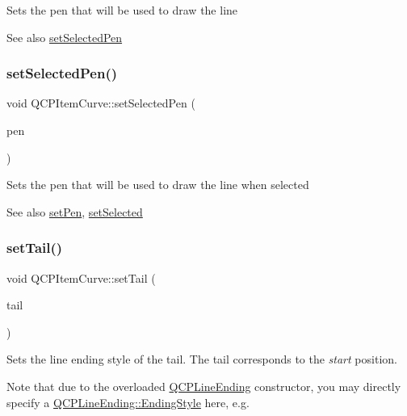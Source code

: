 Sets the pen that will be used to draw the line

\begin{DoxySeeAlso}{See also}
\mbox{\hyperlink{class_q_c_p_item_curve_a375b917669f868c5a106bf2f1ab7c26d}{set\+Selected\+Pen}} 
\end{DoxySeeAlso}
\mbox{\label{class_q_c_p_item_curve_a375b917669f868c5a106bf2f1ab7c26d}} 
\subsubsection{\texorpdfstring{setSelectedPen()}{setSelectedPen()}}
{\footnotesize\ttfamily void Q\+C\+P\+Item\+Curve\+::set\+Selected\+Pen (\begin{DoxyParamCaption}\item[{const Q\+Pen \&}]{pen }\end{DoxyParamCaption})}

Sets the pen that will be used to draw the line when selected

\begin{DoxySeeAlso}{See also}
\mbox{\hyperlink{class_q_c_p_item_curve_a034be908440aec785c34b92843461221}{set\+Pen}}, \mbox{\hyperlink{class_q_c_p_abstract_item_a203de94ad586cc44d16c9565f49d3378}{set\+Selected}} 
\end{DoxySeeAlso}
\mbox{\label{class_q_c_p_item_curve_ac3488d8b1a6489c845dc5bff3ef71124}} 
\subsubsection{\texorpdfstring{setTail()}{setTail()}}
{\footnotesize\ttfamily void Q\+C\+P\+Item\+Curve\+::set\+Tail (\begin{DoxyParamCaption}\item[{const \mbox{\hyperlink{class_q_c_p_line_ending}{Q\+C\+P\+Line\+Ending}} \&}]{tail }\end{DoxyParamCaption})}

Sets the line ending style of the tail. The tail corresponds to the {\itshape start} position.

Note that due to the overloaded \mbox{\hyperlink{class_q_c_p_line_ending}{Q\+C\+P\+Line\+Ending}} constructor, you may directly specify a \mbox{\hyperlink{class_q_c_p_line_ending_a5ef16e6876b4b74959c7261d8d4c2cd5}{Q\+C\+P\+Line\+Ending\+::\+Ending\+Style}} here, e.\+g.
\begin{DoxyCode}{0}
\end{DoxyCode}


